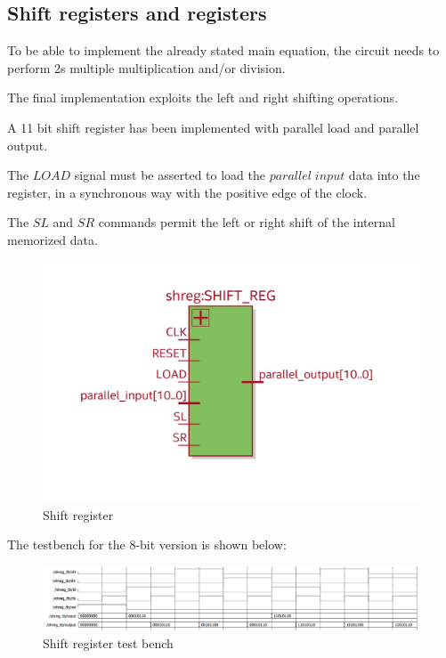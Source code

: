 \documentclass[12pt]{article}
\begin{document}
\newpage
\subsection*{Shift registers and registers}

To be able to implement the already stated main equation, the circuit needs to perform 2s multiple multiplication and/or division.

The final implementation exploits the left and right shifting operations.

A 11 bit shift register has been implemented with parallel load and parallel output.

The $LOAD$ signal must be asserted to load the $parallel\;input$ data into the register, in a synchronous way with the positive edge of the clock.

The $SL$ and $SR$ commands permit the left or right shift of the internal memorized data.  
  

\begin{figure}[h]
	\centering
	\includegraphics[scale = 0.6]{immagini/shreg.jpg}
	\caption{Shift register}
\end{figure}

The testbench for the 8-bit version is shown below:
 
\begin{figure}[h]
	\centering
	\includegraphics[scale = 0.55]{immagini/shift_reg_tb.png}
	\caption{Shift register test bench}
\end{figure}
\end{document}
